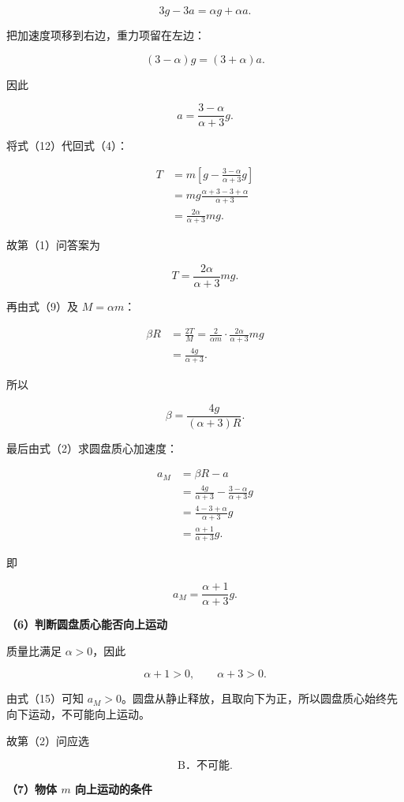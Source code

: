 \documentclass[12pt,a4paper,UTF8]{ctexart}
\begin{document}
\[
3g-3a=\alpha g+\alpha a.
\]

把加速度项移到右边，重力项留在左边：

\[
(3-\alpha)g=(3+\alpha)a.
\]

因此

\[
\boxed{a=\frac{3-\alpha}{\alpha+3}g}.
\tag{12}
\]

将式（12）代回式（4）：

\[
\begin{aligned}
T
&=m\left[g-\frac{3-\alpha}{\alpha+3}g\right]\\
&=mg\frac{\alpha+3-3+\alpha}{\alpha+3}\\
&=\frac{2\alpha}{\alpha+3}mg.
\end{aligned}
\]

故第（1）问答案为

\[
\boxed{T=\frac{2\alpha}{\alpha+3}mg}.
\tag{13}
\]

再由式（9）及 \(M=\alpha m\)：

\[
\begin{aligned}
\beta R
&=\frac{2T}{M}
=\frac{2}{\alpha m}\cdot
\frac{2\alpha}{\alpha+3}mg\\
&=\frac{4g}{\alpha+3}.
\end{aligned}
\]

所以

\[
\boxed{\beta=\frac{4g}{(\alpha+3)R}}.
\tag{14}
\]

最后由式（2）求圆盘质心加速度：

\[
\begin{aligned}
a_M
&=\beta R-a\\
&=\frac{4g}{\alpha+3}
-\frac{3-\alpha}{\alpha+3}g\\
&=\frac{4-3+\alpha}{\alpha+3}g\\
&=\frac{\alpha+1}{\alpha+3}g.
\end{aligned}
\]

即

\[
\boxed{a_M=\frac{\alpha+1}{\alpha+3}g}.
\tag{15}
\]

\textbf{（6）判断圆盘质心能否向上运动}

质量比满足 \(\alpha>0\)，因此

\[
\alpha+1>0,
\qquad
\alpha+3>0.
\]

由式（15）可知
\(a_M>0\)。圆盘从静止释放，且取向下为正，所以圆盘质心始终先向下运动，不可能向上运动。

故第（2）问应选

\[
\boxed{\text{B．不可能}}.
\tag{16}
\]

\textbf{（7）物体 \(m\) 向上运动的条件}
\end{document}
